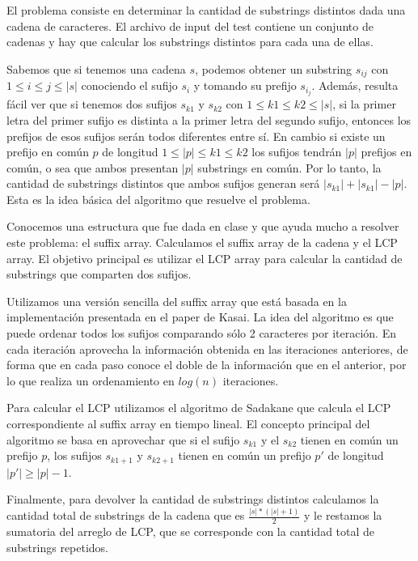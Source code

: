 El problema consiste en determinar la cantidad de substrings distintos dada
una cadena de caracteres. El archivo de input del test contiene un conjunto de
cadenas y hay que calcular los substrings distintos para cada una de ellas.

Sabemos que si tenemos una cadena $s$, podemos obtener un substring $s_{ij}$
con $1 \le i \le j \le |s|$ conociendo el sufijo $s_i$ y tomando su prefijo
$s_{i_j}$. Además, resulta fácil ver que si tenemos dos sufijos $s_{k1}$ y 
$s_{k2}$ con $1 \le k1 \le k2 \le |s|$, si la primer letra del primer sufijo
es distinta a la primer letra del segundo sufijo, entonces los prefijos de esos
sufijos serán todos diferentes entre sí. En cambio si existe un prefijo en común
$p$ de longitud $1 \le |p| \le k1 \le k2$ los sufijos tendrán $|p|$ prefijos
en común, o sea que ambos presentan $|p|$ substrings en común. Por lo tanto, la
cantidad de substrings distintos que ambos sufijos generan será $|s_{k1}| + |s_{k1}| - |p|$.
Esta es la idea básica del algoritmo que resuelve el problema.

Conocemos una estructura que fue dada en clase y que ayuda mucho a resolver este
problema: el suffix array. Calculamos el suffix array de la cadena y el LCP array.
El objetivo principal es utilizar el LCP array para calcular la cantidad de substrings
que comparten dos sufijos.

Utilizamos una versión sencilla del suffix array que está basada en la
implementación presentada en el paper de Kasai. La idea del algoritmo es que
puede ordenar todos los sufijos comparando sólo 2 caracteres por iteración. En
cada iteración aprovecha la información obtenida en las iteraciones anteriores,
de forma que en cada paso conoce el doble de la información que en el anterior,
por lo que realiza un ordenamiento en $log(n)$ iteraciones.

Para calcular el LCP utilizamos el algoritmo de Sadakane que calcula el LCP
correspondiente al suffix array en tiempo lineal. El concepto principal del
algoritmo se basa en aprovechar que si el sufijo $s_{k1}$ y el $s_{k2}$ tienen en
común un prefijo $p$, los sufijos $s_{k1+1}$ y $s_{k2+1}$ tienen en común un prefijo
$p'$ de longitud $|p'| \ge |p|-1$.

Finalmente, para devolver la cantidad de substrings distintos calculamos la cantidad
total de substrings de la cadena que es $\displaystyle\frac{|s|*(|s|+1)}{2}$ y le restamos la
sumatoria del arreglo de LCP, que se corresponde con la cantidad total de substrings
repetidos.

